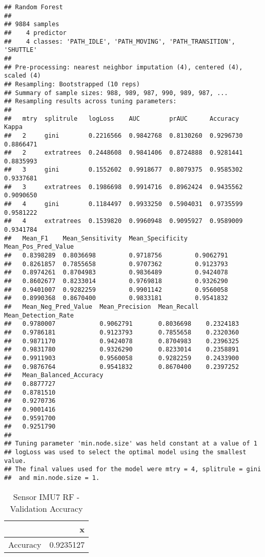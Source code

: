 \documentclass[]{article}
\begin{document}
\begin{verbatim}
## Random Forest 
## 
## 9884 samples
##    4 predictor
##    4 classes: 'PATH_IDLE', 'PATH_MOVING', 'PATH_TRANSITION', 'SHUTTLE' 
## 
## Pre-processing: nearest neighbor imputation (4), centered (4), scaled (4) 
## Resampling: Bootstrapped (10 reps) 
## Summary of sample sizes: 988, 989, 987, 990, 989, 987, ... 
## Resampling results across tuning parameters:
## 
##   mtry  splitrule   logLoss    AUC        prAUC      Accuracy   Kappa    
##   2     gini        0.2216566  0.9842768  0.8130260  0.9296730  0.8866471
##   2     extratrees  0.2448608  0.9841406  0.8724888  0.9281441  0.8835993
##   3     gini        0.1552602  0.9918677  0.8079375  0.9585302  0.9337681
##   3     extratrees  0.1986698  0.9914716  0.8962424  0.9435562  0.9090650
##   4     gini        0.1184497  0.9933250  0.5904031  0.9735599  0.9581222
##   4     extratrees  0.1539820  0.9960948  0.9095927  0.9589009  0.9341784
##   Mean_F1    Mean_Sensitivity  Mean_Specificity  Mean_Pos_Pred_Value
##   0.8398289  0.8036698         0.9718756         0.9062791          
##   0.8261857  0.7855658         0.9707362         0.9123793          
##   0.8974261  0.8704983         0.9836489         0.9424078          
##   0.8602677  0.8233014         0.9769818         0.9326290          
##   0.9401007  0.9282259         0.9901142         0.9560058          
##   0.8990368  0.8670400         0.9833181         0.9541832          
##   Mean_Neg_Pred_Value  Mean_Precision  Mean_Recall  Mean_Detection_Rate
##   0.9780007            0.9062791       0.8036698    0.2324183          
##   0.9786181            0.9123793       0.7855658    0.2320360          
##   0.9871170            0.9424078       0.8704983    0.2396325          
##   0.9831780            0.9326290       0.8233014    0.2358891          
##   0.9911903            0.9560058       0.9282259    0.2433900          
##   0.9876764            0.9541832       0.8670400    0.2397252          
##   Mean_Balanced_Accuracy
##   0.8877727             
##   0.8781510             
##   0.9270736             
##   0.9001416             
##   0.9591700             
##   0.9251790             
## 
## Tuning parameter 'min.node.size' was held constant at a value of 1
## logLoss was used to select the optimal model using the smallest value.
## The final values used for the model were mtry = 4, splitrule = gini
##  and min.node.size = 1.
\end{verbatim}

\begin{table}[!h]

\caption{\label{tab:sensor-rf-results}Sensor IMU7 RF - Validation Accuracy}
\centering
\begin{tabular}[t]{lr}
\toprule
  & x\\
\midrule
Accuracy & 0.9235127\\
\bottomrule
\end{tabular}
\end{table}
\end{document}
